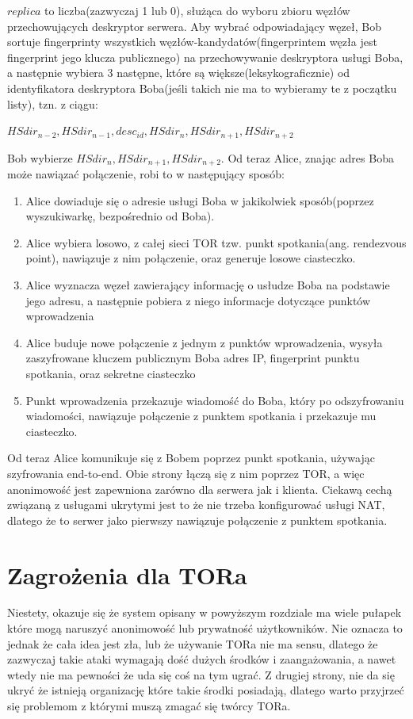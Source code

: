 \documentclass[polish]{kbk}
\begin{document}
$replica$ to liczba(zazwyczaj 1 lub 0), służąca do wyboru zbioru węzłów przechowujących
deskryptor serwera. Aby wybrać odpowiadający węzeł, Bob sortuje fingerprinty wszystkich
węzłów-kandydatów(fingerprintem węzła jest fingerprint jego klucza publicznego) 
na przechowywanie deskryptora usługi Boba, a następnie wybiera 
3 następne, które są większe(leksykograficznie) od identyfikatora deskryptora 
Boba(jeśli takich nie ma to wybieramy te z początku listy),
tzn. z ciągu:
\begin{center}
$HSdir_{n-2}, HSdir_{n-1}, desc_{id}, HSdir_{n}, HSdir_{n+1}, HSdir_{n+2}$
\end{center}
Bob wybierze $HSdir_{n}, HSdir_{n+1}, HSdir_{n+2}$. Od teraz Alice, znając adres
Boba może nawiązać połączenie, robi to w następujący sposób:

\begin{enumerate}
\item Alice dowiaduje się o adresie usługi Boba w jakikolwiek sposób(poprzez wyszukiwarkę,
bezpośrednio od Boba).
\item Alice wybiera losowo, z całej sieci TOR tzw. punkt spotkania(ang. rendezvous point), 
nawiązuje z nim połączenie, oraz generuje losowe ciasteczko.
\item Alice wyznacza węzeł zawierający informację o usłudze Boba na podstawie jego
adresu, a następnie pobiera z niego informacje dotyczące punktów wprowadzenia
\item Alice buduje nowe połączenie z jednym z punktów wprowadzenia, wysyła zaszyfrowane
kluczem publicznym Boba adres IP, fingerprint punktu spotkania, oraz sekretne ciasteczko
\item Punkt wprowadzenia przekazuje wiadomość do Boba, który po odszyfrowaniu wiadomości,
nawiązuje połączenie z punktem spotkania i przekazuje mu ciasteczko.
\end{enumerate}

Od teraz Alice komunikuje się z Bobem poprzez punkt spotkania, używając szyfrowania end-to-end. 
Obie strony łączą się z nim poprzez TOR, a więc anonimowość jest zapewniona zarówno
dla serwera jak i klienta. Ciekawą cechą związaną z usługami ukrytymi jest to że nie 
trzeba konfigurować usługi NAT, dlatego że to serwer jako pierwszy nawiązuje połączenie
z punktem spotkania.

\section{Zagrożenia dla TORa}
Niestety, okazuje się że system opisany w powyższym rozdziale ma wiele pułapek które
mogą naruszyć anonimowość lub prywatność użytkowników. Nie oznacza to jednak że cała
idea jest zła, lub że używanie TORa nie ma sensu, dlatego że zazwyczaj takie ataki
wymagają dość dużych środków i zaangażowania, a nawet wtedy nie ma pewności że uda się
coś na tym ugrać. Z drugiej strony, nie da się ukryć że istnieją organizację które takie
środki posiadają, dlatego warto przyjrzeć się problemom z którymi muszą zmagać się
twórcy TORa.
\end{document}
